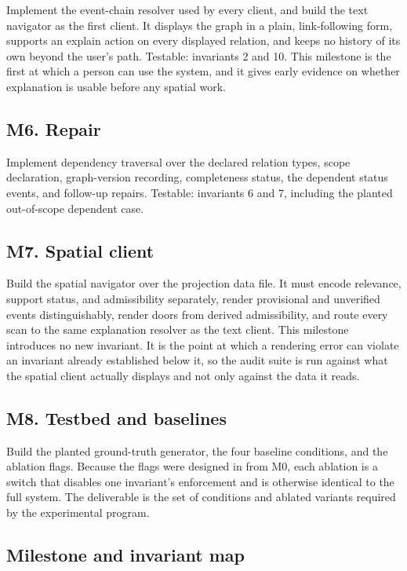 \documentclass[11pt]{article}
\begin{document}
Implement the event-chain resolver used by every client, and build the text navigator as the first client. It displays the graph in a plain, link-following form, supports an explain action on every displayed relation, and keeps no history of its own beyond the user's path. Testable: invariants 2 and 10. This milestone is the first at which a person can use the system, and it gives early evidence on whether explanation is usable before any spatial work.

\subsection*{M6. Repair}

Implement dependency traversal over the declared relation types, scope declaration, graph-version recording, completeness status, the dependent status events, and follow-up repairs. Testable: invariants 6 and 7, including the planted out-of-scope dependent case.

\subsection*{M7. Spatial client}

Build the spatial navigator over the projection data file. It must encode relevance, support status, and admissibility separately, render provisional and unverified events distinguishably, render doors from derived admissibility, and route every scan to the same explanation resolver as the text client. This milestone introduces no new invariant. It is the point at which a rendering error can violate an invariant already established below it, so the audit suite is run against what the spatial client actually displays and not only against the data it reads.

\subsection*{M8. Testbed and baselines}

Build the planted ground-truth generator, the four baseline conditions, and the ablation flags. Because the flags were designed in from M0, each ablation is a switch that disables one invariant's enforcement and is otherwise identical to the full system. The deliverable is the set of conditions and ablated variants required by the experimental program.

\subsection{Milestone and invariant map}
\end{document}
